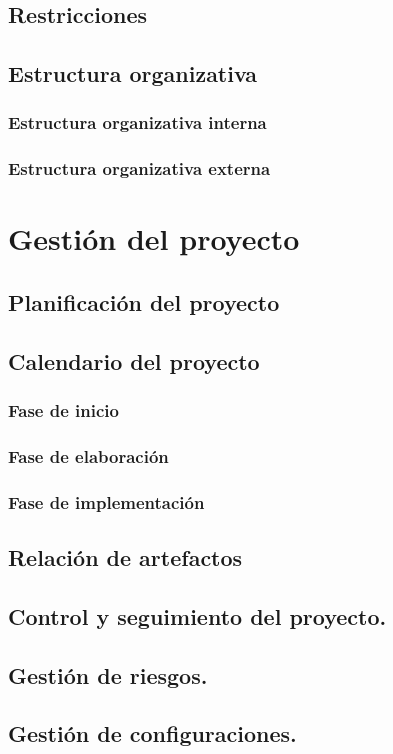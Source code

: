 \documentclass[twoside]{report}
\begin{document}
\subsection{Restricciones}
\subsection{Estructura organizativa}
\subsubsection{Estructura organizativa interna}
\subsubsection{Estructura organizativa externa}
\section{Gestión del proyecto}
\subsection{Planificación del proyecto}
\subsection{Calendario del proyecto}
\subsubsection{Fase de inicio}
\subsubsection{Fase de elaboración}
\subsubsection{Fase de implementación}
\subsection{Relación de artefactos}
\subsection{Control y seguimiento del proyecto.}
\subsection{Gestión de riesgos.}
\subsection{Gestión de configuraciones.}
\end{document}
